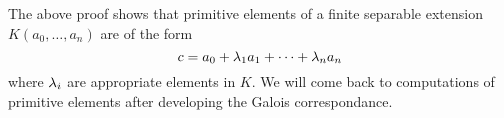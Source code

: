 \documentclass[../book.tex]{subfiles}
\begin{document}
\begin{rmk}
    The above proof shows that primitive elements of a finite separable extension
    $K(a_0,\dots,a_{n})$ are of the form \[
        c = a_0 + \lambda_1 a_1 + \cdots + \lambda_n a_n
    \]
    where $\lambda_i$ are appropriate elements in $K$. 
    We will come back to computations of primitive elements 
    after developing the Galois correspondance. 
\end{rmk}
\end{document}
